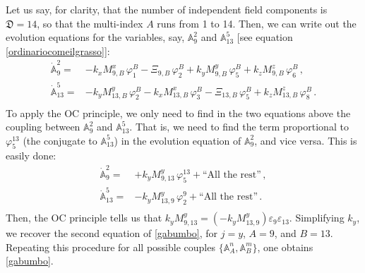 \documentclass[a4paper, amsfonts, amssymb, amsmath, reprint, showkeys, nofootinbib, twoside, onecolumn,notitlepage]{revtex4-1}
\begin{document}
Let us say, for clarity, that the number of independent field components is  $\mathfrak{D}=14$, so that the multi-index $A$ runs from 1 to 14. Then, we can write out the evolution equations for the variables, say, $\mathbb{A}^2_9$ and $\mathbb{A}^5_{13}$ [see equation \eqref{ordinariocomeilgrasso}]:
\begin{equation}
\begin{split}
\dot{\mathbb{A}}^2_9 ={}& -k_x M^x_{9,B} \, \varphi^B_1 - \Xi_{9,B} \, \varphi_2^B + k_y M^y_{9,B} \, \varphi^B_5 + k_z M^z_{9,B} \, \varphi^B_6 \, , \\
\dot{\mathbb{A}}^5_{13} ={}& -k_y M^y_{13,B} \, \varphi_2^B -k_x M^x_{13,B}\, \varphi_3^B - \Xi_{13,B} \, \varphi^B_5 + k_z M^z_{13,B}\, \varphi_8^B \, .  \\
\end{split}
\end{equation} 
To apply the OC principle, we only need to find in the two equations above the coupling between  $\mathbb{A}^2_9$ and $\mathbb{A}^5_{13}$. That is, we need to find the term proportional to $\varphi_5^{13}$ (the conjugate to $\mathbb{A}^5_{13}$) in the evolution equation of $\mathbb{A}^2_9$, and vice versa. This is easily done:
\begin{equation}
\begin{split}
\dot{\mathbb{A}}^2_9 ={}& +k_y M^y_{9,13} \, \varphi^{13}_5 +\text{``All the rest''} \, , \\
\dot{\mathbb{A}}^5_{13} ={}& -k_y M^y_{13,9} \, \varphi_2^9 +\text{``All the rest''} \, .  \\
\end{split}
\end{equation} 
Then, the OC principle tells us that $k_y M^y_{9,13}=(-k_y M^y_{13,9})\varepsilon_9 \varepsilon_{13}$. Simplifying $k_y$, we recover the second equation of \eqref{gabumbo}, for $j=y$, $A=9$, and $B=13$. Repeating this procedure for all possible couples $\{\mathbb{A}_A^n, \mathbb{A}_B^m \}$, one obtains \eqref{gabumbo}. 
\end{document}
